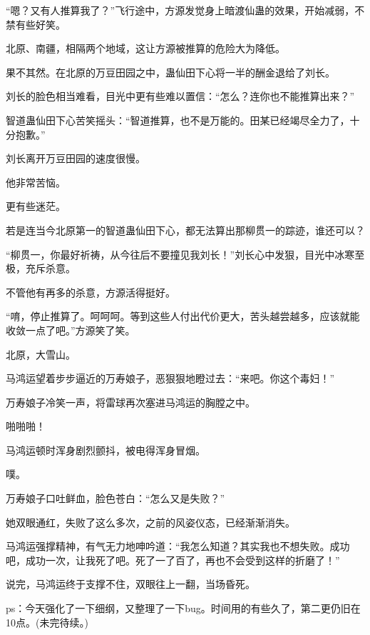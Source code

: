 \begin{this_body}
“嗯？又有人推算我了？”飞行途中，方源发觉身上暗渡仙蛊的效果，开始减弱，不禁有些好笑。

北原、南疆，相隔两个地域，这让方源被推算的危险大为降低。

果不其然。在北原的万豆田园之中，蛊仙田下心将一半的酬金退给了刘长。

刘长的脸色相当难看，目光中更有些难以置信：“怎么？连你也不能推算出来？”

智道蛊仙田下心苦笑摇头：“智道推算，也不是万能的。田某已经竭尽全力了，十分抱歉。”

刘长离开万豆田园的速度很慢。

他非常苦恼。

更有些迷茫。

若是连当今北原第一的智道蛊仙田下心，都无法算出那柳贯一的踪迹，谁还可以？

“柳贯一，你最好祈祷，从今往后不要撞见我刘长！”刘长心中发狠，目光中冰寒至极，充斥杀意。

不管他有再多的杀意，方源活得挺好。

“唷，停止推算了。呵呵呵。等到这些人付出代价更大，苦头越尝越多，应该就能收敛一点了吧。”方源笑了笑。

北原，大雪山。

马鸿运望着步步逼近的万寿娘子，恶狠狠地瞪过去：“来吧。你这个毒妇！”

万寿娘子冷笑一声，将雷球再次塞进马鸿运的胸膛之中。

啪啪啪！

马鸿运顿时浑身剧烈颤抖，被电得浑身冒烟。

噗。

万寿娘子口吐鲜血，脸色苍白：“怎么又是失败？”

她双眼通红，失败了这么多次，之前的风姿仪态，已经渐渐消失。

马鸿运强撑精神，有气无力地呻吟道：“我怎么知道？其实我也不想失败。成功吧，成功一次，让我死了吧。死了一了百了，再也不会受到这样的折磨了！”

说完，马鸿运终于支撑不住，双眼往上一翻，当场昏死。

ps：今天强化了一下细纲，又整理了一下bug。时间用的有些久了，第二更仍旧在10点。(未完待续。)

\end{this_body}

